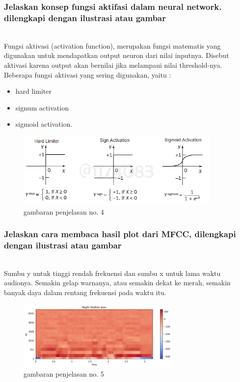 \subsubsection{Jelaskan konsep fungsi aktifasi dalam neural network. dilengkapi dengan ilustrasi atau gambar}
\hfill\\
Fungsi aktivasi (activation function), merupakan fungsi matematis yang digunakan untuk mendapatkan output neuron dari nilai inputnya. Disebut aktivasi karena output akan bernilai jika melampaui nilai threshold-nya. Beberapa fungsi aktivasi yang sering digunakan, yaitu : 
\begin{itemize}
\item hard limiter
\item signum activation 
\item sigmoid activation.
\end{itemize} 
\begin{figure}[H]
	\centering
	\includegraphics[width=10cm]{figures/1174083/figures6/4.png}
	\caption{gambaran penjelasan no. 4}
\end{figure}

\subsubsection{Jelaskan cara membaca hasil plot dari MFCC, dilengkapi dengan ilustrasi atau gambar}
\hfill\\
Sumbu y untuk tinggi rendah frekuensi dan sumbu x untuk lama waktu audionya. Semakin gelap warnanya, atau semakin dekat ke merah, semakin banyak daya dalam rentang frekuensi pada waktu itu.
\begin{figure}[H]
	\centering
	\includegraphics[width=8cm]{figures/1174083/figures6/5.png}
	\caption{gambaran penjelasan no. 5}
\end{figure}


